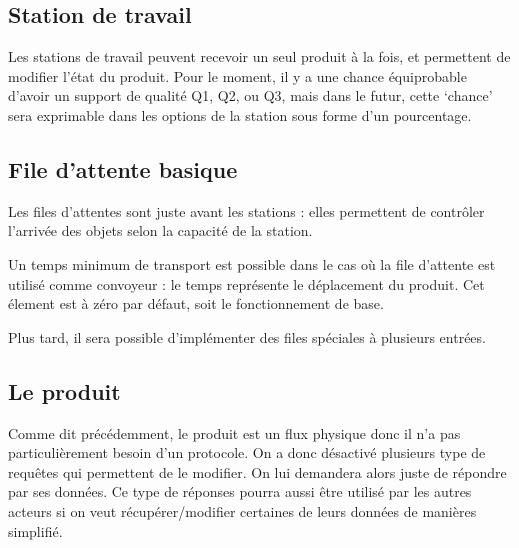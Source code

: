 \documentclass[12pt,a4paper]{article}
\begin{document}
		\subsection{Station de travail}
			Les stations de travail peuvent recevoir un seul produit à la fois, 
			et permettent de modifier l'état du produit. Pour le moment, il y a
			une chance équiprobable d'avoir un support de qualité Q1, Q2, ou Q3,
			mais dans le futur, cette `chance' sera exprimable dans les options
			de la station sous forme d'un pourcentage.

		\subsection{File d'attente basique}
			Les files d'attentes sont juste avant les stations : elles 
			permettent de contrôler l'arrivée des objets selon la capacité
			de la station.

			Un temps minimum de transport est possible dans le cas où la file 
			d'attente est utilisé comme convoyeur : le temps représente le
			déplacement du produit. Cet élement est à zéro par défaut, soit le 
			fonctionnement de base.

			Plus tard, il sera possible d'implémenter des files spéciales à
			plusieurs entrées.
		 
		\subsection{Le produit}
			 Comme dit précédemment, le produit est un flux physique donc il 
			 n'a pas particulièrement besoin d'un protocole. On a donc désactivé
			 plusieurs type de requêtes qui permettent de le modifier. 
			 On lui demandera alors juste de répondre par ses données. 
			 Ce type de réponses pourra aussi être utilisé par les autres acteurs 
			 si on veut récupérer/modifier certaines de leurs données de 
			 manières simplifié.
\end{document}
